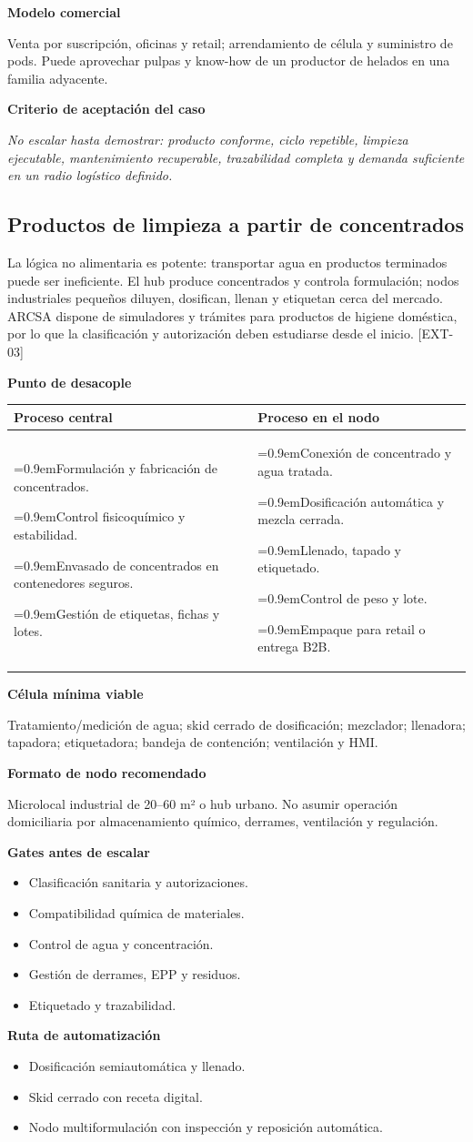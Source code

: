 \documentclass[11pt,a4paper]{article}
\makeatletter
\newcommand{\etiqueta}[1]{\par\medskip\noindent\textbf{#1}\par\nopagebreak\smallskip}
\newcommand{\ti}{\par\hangindent=0.9em\hangafter=1\noindent\makebox[0.9em][l]{\textbullet}}
\newcommand{\desacople}[2]{\etiqueta{Punto de desacople}
  {\small\noindent\begin{tabularx}{\textwidth}{@{}>{\raggedright\arraybackslash}X>{\raggedright\arraybackslash}X@{}}
  \toprule \textbf{Proceso central} & \textbf{Proceso en el nodo}\\ \midrule
  #1 & #2\\ \bottomrule\end{tabularx}}\par}
\newcommand{\rutas}[3]{\etiqueta{Ruta de automatización}
  \begin{itemize}[leftmargin=2.6em,labelwidth=2em]
  \item[\textbf{1.0}] #1
  \item[\textbf{2.0}] #2
  \item[\textbf{3.0}] #3
  \end{itemize}}
\newcommand{\criterio}{\etiqueta{Criterio de aceptación del caso}
  \noindent\textit{No escalar hasta demostrar: producto conforme, ciclo repetible, limpieza ejecutable,
  mantenimiento recuperable, trazabilidad completa y demanda suficiente en un radio logístico definido.}\par}
\makeatother
\begin{document}
\etiqueta{Modelo comercial}
Venta por suscripción, oficinas y retail; arrendamiento de célula y suministro de pods. Puede aprovechar
pulpas y know-how de un productor de helados en una familia adyacente.

\criterio

\subsection{Productos de limpieza a partir de concentrados}
La lógica no alimentaria es potente: transportar agua en productos terminados puede ser ineficiente. El
hub produce concentrados y controla formulación; nodos industriales pequeños diluyen, dosifican, llenan y
etiquetan cerca del mercado. ARCSA dispone de simuladores y trámites para productos de higiene doméstica,
por lo que la clasificación y autorización deben estudiarse desde el inicio. [EXT-03]

\desacople{%
\ti Formulación y fabricación de concentrados.
\ti Control fisicoquímico y estabilidad.
\ti Envasado de concentrados en contenedores seguros.
\ti Gestión de etiquetas, fichas y lotes.}{%
\ti Conexión de concentrado y agua tratada.
\ti Dosificación automática y mezcla cerrada.
\ti Llenado, tapado y etiquetado.
\ti Control de peso y lote.
\ti Empaque para retail o entrega B2B.}

\etiqueta{Célula mínima viable}
Tratamiento/medición de agua; skid cerrado de dosificación; mezclador; llenadora; tapadora;
etiquetadora; bandeja de contención; ventilación y HMI.

\etiqueta{Formato de nodo recomendado}
Microlocal industrial de 20--60 m² o hub urbano. No asumir operación domiciliaria por almacenamiento
químico, derrames, ventilación y regulación.

\etiqueta{Gates antes de escalar}
\begin{itemize}
\item Clasificación sanitaria y autorizaciones.
\item Compatibilidad química de materiales.
\item Control de agua y concentración.
\item Gestión de derrames, EPP y residuos.
\item Etiquetado y trazabilidad.
\end{itemize}

\rutas{Dosificación semiautomática y llenado.}
{Skid cerrado con receta digital.}
{Nodo multiformulación con inspección y reposición automática.}
\end{document}
